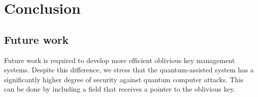 


%

\chapter{Conclusion}




\section{Future work}





Future work is required to develop more efficient oblivious key management systems. Despite this difference, we stress that the quantum-assisted system has a significantly higher degree of security against quantum computer attacks.   This can be done by including a field that receives a pointer to the oblivious key. 








%
%
%
